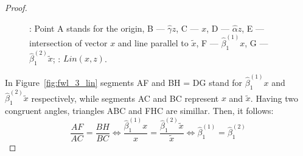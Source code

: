 \documentclass[nobib]{tufte-handout}
\theoremstyle{definition}
\begin{document}
\begin{proof}
\begin{figure}[ht!]
\begin{center}
\hspace{4ex}
\caption{: Point A stands for the origin, B — $\hat\gamma z$,
C — $x$, D — $\hat\alpha z$, E — intersection of vector $x$ and line parallel to $\tilde x$,
F — $\hat\beta_1^{(1)} x$, G — $\hat\beta_1^{(2)} \tilde{x}$; : $Lin(x,z)$.}
\end{center}
\end{figure}

In Figure~\ref{fig:fwl_3_lin} segments AF and BH = DG stand for $\hat\beta_1^{(1)}x$
and $\hat\beta_1^{(2)}\tilde x$ respectively, while segments AC and BC represent $x$ and $\tilde{x}$.
Having two congruent angles, triangles ABC and FHC are simillar.
Then, it follows:
\[
\frac{AF}{AC} = \frac{BH}{BC} \Leftrightarrow \frac{\hat\beta_1^{(1)}x}{x} = \frac{\hat\beta_1^{(2)}\tilde x}{\tilde x} \Leftrightarrow \hat\beta_1^{(1)} = \hat\beta_1^{(2)}
\]
\end{proof}


\end{document}
